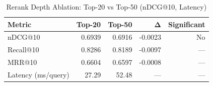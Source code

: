 \begin{table}[H]
\centering
\caption{Rerank Depth Ablation: Top-20 vs Top-50 (nDCG@10, Latency)}
\label{tab:val_depth}
\begin{tabular}{lrrrr}
\toprule
Metric & Top-20 & Top-50 & Δ & Significant \\
\midrule
nDCG@10 & 0.6939 & 0.6916 & -0.0023 & No \\
Recall@10 & 0.8286 & 0.8189 & -0.0097 & — \\
MRR@10 & 0.6604 & 0.6597 & -0.0008 & — \\
Latency (ms/query) & 27.29 & 52.48 & — & — \\
\bottomrule
\end{tabular}
\end{table}